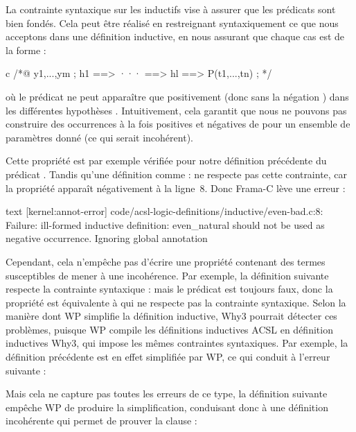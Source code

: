 La contrainte syntaxique sur les inductifs vise à assurer que les prédicats sont
bien fondés. Cela peut être réalisé en restreignant syntaxiquement ce que nous
acceptons dans une définition inductive, en nous assurant que chaque cas est de
la forme :
\begin{CodeBlock}{c}
/*@
  \forall y1,...,ym ; h1 ==> ··· ==> hl ==> P(t1,...,tn) ;
*/
\end{CodeBlock}
où le prédicat  ne peut apparaître que positivement (donc sans la
négation \CodeInline{!}) dans les différentes hypothèses .
Intuitivement, cela garantit que nous ne pouvons pas construire des occurrences à
la fois positives et négatives de  pour un ensemble de paramètres
donné (ce qui serait incohérent).


Cette propriété est par exemple vérifiée pour notre définition précédente du
prédicat . Tandis qu'une définition comme :
ne respecte pas cette contrainte, car la propriété 
apparaît négativement à la ligne~8. Donc Frama-C lève une erreur :


\begin{CodeBlock}{text}
[kernel:annot-error] code/acsl-logic-definitions/inductive/even-bad.c:8: Failure:
  ill-formed inductive definition: even_natural should not be used as
  negative occurrence. Ignoring global annotation
\end{CodeBlock}


Cependant, cela n'empêche pas d'écrire une propriété contenant des termes
susceptibles de mener à une incohérence. Par exemple, la définition suivante respecte
la contrainte syntaxique :
mais le prédicat 
est toujours faux, donc la propriété est équivalente à
 qui ne respecte pas la contrainte syntaxique.
Selon la manière dont WP simplifie la définition inductive, Why3 pourrait
détecter ces problèmes, puisque WP compile les définitions inductives ACSL en
définition inductives Why3, qui impose les mêmes contraintes syntaxiques. Par
exemple, la définition précédente est en effet simplifiée par WP, ce qui
conduit à l'erreur suivante :


Mais cela ne capture pas toutes les erreurs de ce type, la définition suivante
empêche WP de produire la simplification, conduisant donc à une définition
incohérente qui permet de prouver la clause
 :



